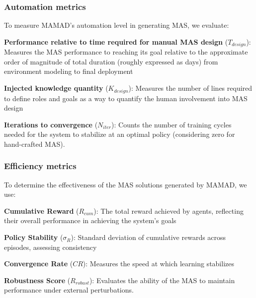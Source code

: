 \documentclass[pdflatex,sn-mathphys-num]{sn-jnl}%
\theoremstyle{thmstyleone}%
\theoremstyle{thmstyletwo}%
\theoremstyle{thmstylethree}%
\begin{document}
\subsubsection{Automation metrics}
To measure MAMAD's automation level in generating MAS, we evaluate:
\begin{enumerate*}[label={\roman*)}, itemjoin={; \quad}]
    \item \textbf{Performance relative to time required for manual MAS design} ($T_{design}$): Measures the MAS performance to reaching its goal relative to the approximate order of magnitude of total duration (roughly expressed as days) from environment modeling to final deployment
    \item \textbf{Injected knowledge quantity} ($K_{design}$): Measures the number of lines required to define roles and goals as a way to quantify the human involvement into MAS design
    \item \textbf{Iterations to convergence} ($N_{iter}$): Counts the number of training cycles needed for the system to stabilize at an optimal policy (considering zero for hand-crafted MAS).
\end{enumerate*}

\subsubsection{Efficiency metrics}
To determine the effectiveness of the MAS solutions generated by MAMAD, we use:
\begin{enumerate*}[label={\roman*)}, itemjoin={; \quad}]
    \item \textbf{Cumulative Reward} ($R_{cum}$): The total reward achieved by agents, reflecting their overall performance in achieving the system's goals
    \item \textbf{Policy Stability} ($\sigma_R$): Standard deviation of cumulative rewards across episodes, assessing consistency
    \item \textbf{Convergence Rate} ($CR$): Measures the speed at which learning stabilizes
    \item \textbf{Robustness Score} ($R_{robust}$): Evaluates the ability of the MAS to maintain performance under external perturbations.
\end{enumerate*}
\end{document}
